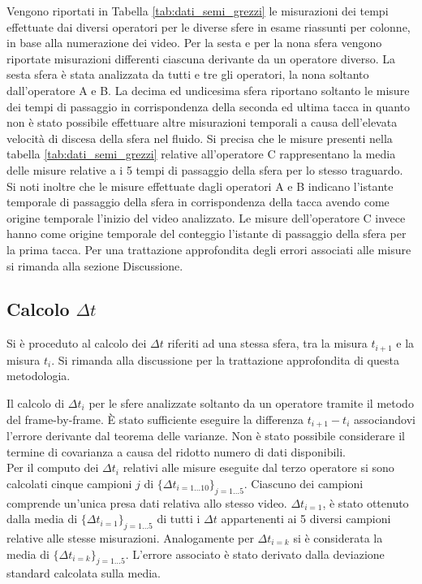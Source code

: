 \documentclass[a4paper,11pt,oneside]{article}
\begin{document}
Vengono riportati in Tabella \ref{tab:dati_semi_grezzi} le misurazioni dei tempi effettuate dai diversi operatori per le diverse sfere in esame riassunti per colonne, in base alla numerazione dei video.
Per la sesta e per la nona sfera vengono riportate misurazioni differenti ciascuna derivante da un operatore diverso. La sesta sfera è stata analizzata da tutti e tre gli operatori, la nona soltanto dall'operatore A e B.
La decima ed undicesima sfera riportano soltanto le misure dei tempi di passaggio in corrispondenza della seconda ed ultima tacca in quanto non è stato possibile effettuare altre misurazioni temporali a causa dell'elevata velocità di discesa della sfera nel fluido.
Si precisa che le misure presenti nella tabella \ref{tab:dati_semi_grezzi} relative all'operatore C rappresentano la media delle misure relative a i 5 tempi di passaggio della sfera per lo stesso traguardo.
Si noti inoltre che le misure effettuate dagli operatori A e B indicano l'istante temporale di passaggio della sfera in corrispondenza della tacca avendo come origine temporale l'inizio del video analizzato. Le misure dell'operatore C invece hanno come origine temporale  del conteggio l'istante di passaggio della sfera per la prima tacca.
Per una trattazione approfondita degli errori associati alle misure si rimanda alla sezione Discussione.\\




\subsection{Calcolo $\Delta t$}
Si è proceduto al calcolo dei $\Delta t$ riferiti ad una stessa sfera, tra la misura $t_{i+1}$ e la misura $t_{i}$. Si rimanda alla discussione per la trattazione approfondita di questa metodologia.

Il calcolo di $\Delta t_{i}$ per le sfere analizzate soltanto da un operatore tramite il metodo del frame-by-frame. È stato sufficiente eseguire la differenza $t_{i+1}- t_{i}$ associandovi l'errore derivante dal teorema delle varianze. Non è stato possibile considerare il termine di covarianza a causa del ridotto numero di dati disponibili.\\
\newline
Per il computo dei $\Delta t_{i}$ relativi alle misure eseguite dal terzo operatore si sono calcolati cinque campioni $j$ di $\{\Delta t_{i=1\dots10}\}_{j=1\dots5}$. Ciascuno dei campioni comprende un'unica presa dati relativa allo stesso video.
$\Delta t_{i=1}$, è stato ottenuto dalla media di $\{\Delta t_{i=1}\}_{j=1\dots5}$ di tutti i $\Delta t$ appartenenti ai 5 diversi campioni relative alle stesse misurazioni. Analogamente per $\Delta t_{i=k}$ si è considerata la media di $\{{\Delta t_{i=k}}\}_{j=1\dots5}$. L'errore associato è stato derivato dalla deviazione standard calcolata sulla media.
\end{document}
